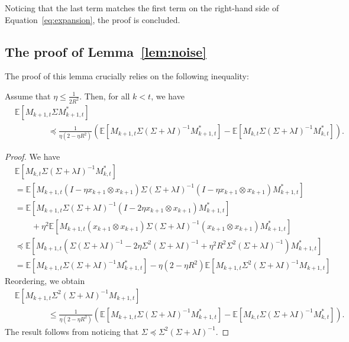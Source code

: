 \documentclass[final,12pt]{colt2018} %
\newcommand{\EE}[1]{\mathbb{E}\left[#1\right]}
\newcommand{\pa}[1]{\left(#1\right)}
\begin{document}
Noticing that the last term matches the first term on the right-hand side of Equation~\eqref{eq:expansion}, the proof is concluded.
\jmlrQED


\subsection{The proof of Lemma~\ref{lem:noise}}\label{app:noise}
The proof of this lemma crucially relies on the following inequality:
\begin{lemma}\label{lem:recurrence}
 Assume that $\eta \le \frac{1}{2R^2}$. Then, for all $k<t$, we have
 \begin{align*}
  &\EE{M_{k+1,t} \Sigma M_{k+1,t}^*} 
  \\
  &\qquad\qquad \preccurlyeq \frac{1}{\eta \pa{2 - \eta R^2}} \pa{\EE{M_{k+1,t} 
\Sigma\pa{\Sigma + \lambda I}^{-1}M_{k+1,t}^*} - \EE{M_{k,t} \Sigma\pa{\Sigma + \lambda I}^{-1}M_{k,t}^*}}.
 \end{align*}
\end{lemma}
\begin{proof}
 We have
 \begin{align*}
  &\EE{M_{k,t} \Sigma \pa{\Sigma + \lambda I}^{-1} M_{k,t}^*} 
  \\
  &= \EE{M_{k+1,t} \pa{I - \eta x_{k+1}\otimes x_{k+1}}\Sigma \pa{\Sigma + 
\lambda I}^{-1} \pa{I - \eta x_{k+1} \otimes x_{k+1}} M_{k+1,t}^*}
\\
&= \EE{M_{k+1,t} \Sigma\pa{\Sigma + \lambda I}^{-1}\pa{I - 2\eta x_{k+1} \otimes x_{k+1}}M_{k+1,t}^*} 
\\
&\qquad + \eta^2\EE{M_{k+1,t} \pa{x_{k+1} \otimes x_{k+1}} \Sigma \pa{\Sigma + \lambda I}^{-1} \pa{x_{k+1} \otimes x_{k+1}} 
M_{k+1,t}^*}
\\
&\preccurlyeq \EE{M_{k+1,t} \pa{\Sigma\pa{\Sigma + \lambda I}^{-1}  - 2\eta \Sigma^2 \pa{\Sigma + \lambda I}^{-1}  + 
\eta^2 R^2 \Sigma^2 \pa{\Sigma + \lambda I}^{-1}} M_{k+1,t}^*}
\\
&= \EE{M_{k+1,t} \Sigma\pa{\Sigma + \lambda I}^{-1}M_{k+1,t}^*} - \eta \pa{2 - \eta R^2} \EE{ M_{k+1,t} \Sigma^2 \pa{\Sigma + 
\lambda I}^{-1} M_{k+1,t}}
 \end{align*}
 Reordering, we obtain
 \begin{align*}
  &\EE{ M_{k+1,t} \Sigma^2 \pa{\Sigma + \lambda I}^{-1} M_{k+1,t}} 
  \\
  &\qquad\qquad \le \frac{1}{\eta \pa{2 - \eta R^2}} \pa{\EE{M_{k+1,t} 
\Sigma\pa{\Sigma + \lambda I}^{-1}M_{k+1,t}^*} - \EE{M_{k,t} \Sigma\pa{\Sigma + \lambda I}^{-1}M_{k,t}^*}}.
 \end{align*}
 The result follows from noticing that $\Sigma \preccurlyeq \Sigma^2 \pa{\Sigma + \lambda I}^{-1}$.
\end{proof}
\end{document}
